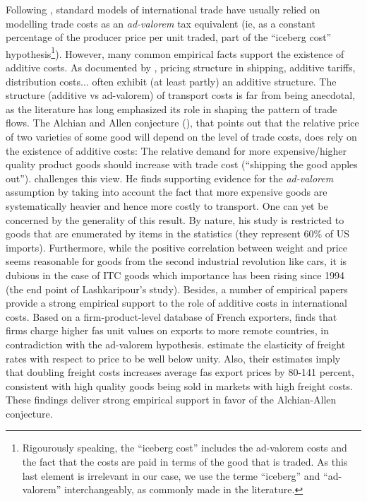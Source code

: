 \documentclass[a4paper,11pt]{article}
\begin{document}

Following \citet{samuelson1954}, standard models of international trade have usually relied on modelling trade costs as an \emph{ad-valorem} tax equivalent (ie, as a constant percentage of the producer price per unit traded, part of the ``iceberg cost'' hypothesis\footnote{Rigourously speaking, the ``iceberg cost'' includes the ad-valorem costs and the fact that the costs are paid in terms of the good that is traded. As this last element is irrelevant in our case, we use the terme ``iceberg'' and ``ad-valorem'' interchangeably, as commonly made in the literature.}). However, many common empirical facts support the existence of additive costs. As documented by \citet{Irrazabal_2015}, pricing structure in shipping, additive tariffs, distribution costs... often exhibit (at least partly) an additive structure. The structure (additive vs ad-valorem) of transport costs is far from being anecdotal, as the literature has long emphasized its role in shaping the pattern of trade flows. The Alchian and Allen conjecture (\citealp{alchian}), that points out that the relative price of two varieties of some good will depend on the level of trade costs, does rely on the existence of additive costs: The relative demand for more expensive/higher quality product goods should increase with trade cost (``shipping the good apples out''). \citet{Lashkaripour-mimeo-2016} challenges this view. He finds supporting evidence for the \emph{ad-valorem} assumption by taking into account the fact that more expensive goods are systematically heavier and hence more costly to transport. One can yet be concerned by the generality of this result. By nature, his study is restricted to goods that are enumerated by items in the statistics (they represent 60\% of US imports). Furthermore, while the positive correlation between weight and price seems reasonable for goods from the second industrial revolution like cars, it is dubious in the case of ITC goods which importance has been rising since 1994 (the end point of Lashkaripour's study). Besides, a number of empirical papers provide a strong empirical support to the role of additive costs in international costs. Based on a firm-product-level database of French exporters, \citet{martin2012} finds that firms charge higher fas unit values on exports to more remote countries, in contradiction with the ad-valorem hypothesis. \citet{hummels_skiba} estimate the elasticity of freight rates with respect to price to be well below unity. Also, their estimates imply that doubling freight costs increases average fas export prices by 80-141 percent, consistent with high quality goods being sold in markets with high freight costs. These findings deliver strong empirical support in favor of the Alchian-Allen conjecture.
\smallskip
\end{document}
